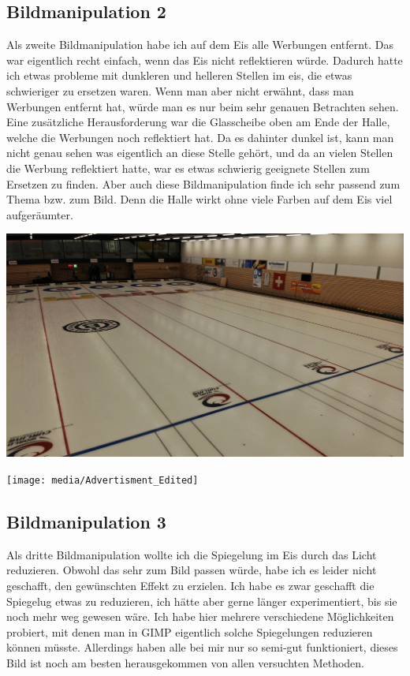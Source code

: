 \documentclass[11pt]{article}
\begin{document}
    \subsection{Bildmanipulation 2}
    Als zweite Bildmanipulation habe ich auf dem Eis alle Werbungen entfernt. Das war eigentlich recht einfach, wenn das Eis nicht reflektieren
    würde. Dadurch hatte ich etwas probleme mit dunkleren und helleren Stellen im eis, die etwas schwieriger zu ersetzen waren. Wenn man aber
    nicht erwähnt, dass man Werbungen entfernt hat, würde man es nur beim sehr genauen Betrachten sehen. Eine zusätzliche Herausforderung war die
    Glasscheibe oben am Ende der Halle, welche die Werbungen noch reflektiert hat. Da es dahinter dunkel ist, kann man nicht genau sehen was
    eigentlich an diese Stelle gehört, und da an vielen Stellen die Werbung reflektiert hatte, war es etwas schwierig geeignete Stellen zum
    Ersetzen zu finden. Aber auch diese Bildmanipulation finde ich sehr passend zum Thema bzw. zum Bild. Denn die Halle wirkt ohne viele Farben
    auf dem Eis viel aufgeräumter.

    \noindent
    \begin{minipage}{0.5\textwidth}
        \includegraphics[width=\linewidth]{media/Advertisment_Unedited}
    \end{minipage}
    \hfill
    \begin{minipage}[c]{0.5\textwidth}
        \texttt{[image: media/Advertisment\_Edited]}
    \end{minipage}

    \subsection{Bildmanipulation 3}
    Als dritte Bildmanipulation wollte ich die Spiegelung im Eis durch das Licht reduzieren. Obwohl das sehr zum Bild passen würde, habe ich es
    leider nicht geschafft, den gewünschten Effekt zu erzielen. Ich habe es zwar geschafft die Spiegelug etwas zu reduzieren, ich hätte aber
    gerne länger experimentiert, bis sie noch mehr weg gewesen wäre. Ich habe hier mehrere verschiedene Möglichkeiten probiert, mit denen man
    in GIMP eigentlich solche Spiegelungen reduzieren können müsste. Allerdings haben alle bei mir nur so semi-gut funktioniert, dieses Bild
    ist noch am besten herausgekommen von allen versuchten Methoden.
\end{document}
